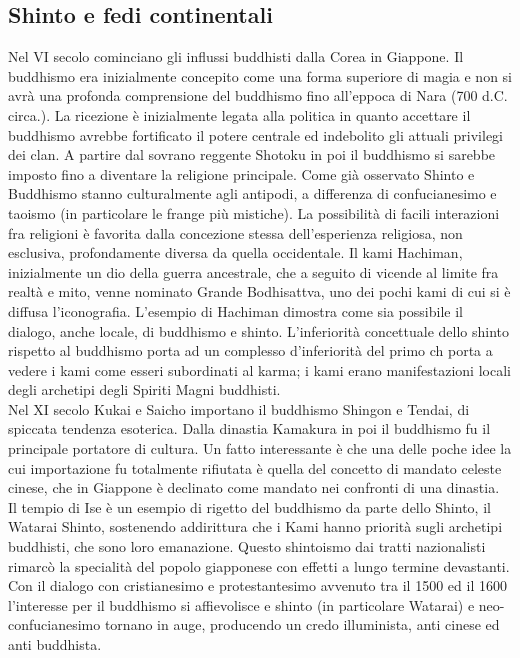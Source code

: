 \documentclass[10pt,a4paper]{report}
\begin{document}
\subsection{Shinto e fedi continentali}
Nel VI secolo cominciano gli influssi buddhisti dalla Corea in Giappone. Il buddhismo era inizialmente concepito come una forma superiore di magia e non si avrà una profonda comprensione del buddhismo fino all'eppoca di Nara (700 d.C. circa.). La ricezione è inizialmente legata alla politica in quanto accettare il buddhismo avrebbe fortificato il potere centrale ed indebolito gli attuali privilegi dei clan. A partire dal sovrano reggente Shotoku in poi il buddhismo si sarebbe imposto fino a diventare la religione principale. Come già osservato Shinto e Buddhismo stanno culturalmente agli antipodi, a differenza di confucianesimo e taoismo (in particolare le frange più mistiche). La possibilità di facili interazioni fra religioni è favorita dalla concezione stessa dell'esperienza religiosa, non esclusiva, profondamente diversa da quella occidentale. Il kami Hachiman, inizialmente un dio della guerra ancestrale, che a seguito di vicende al limite fra realtà e mito, venne nominato Grande Bodhisattva, uno dei pochi kami di cui si è diffusa l'iconografia. L'esempio di Hachiman dimostra come sia possibile il dialogo, anche locale, di buddhismo e shinto. L'inferiorità concettuale dello shinto rispetto al buddhismo porta ad un complesso d'inferiorità del primo ch porta a vedere i kami come esseri subordinati al karma; i kami erano manifestazioni locali degli archetipi degli Spiriti Magni buddhisti.\\
Nel XI secolo Kukai e Saicho importano il buddhismo Shingon e Tendai, di spiccata tendenza esoterica. Dalla dinastia Kamakura in poi il buddhismo fu il principale portatore di cultura. Un fatto interessante è che una delle poche idee la cui importazione fu totalmente rifiutata è quella del concetto di mandato celeste cinese, che in Giappone è declinato come mandato nei confronti di una dinastia. Il tempio di Ise è un esempio di rigetto del buddhismo da parte dello Shinto, il Watarai Shinto, sostenendo addirittura che i Kami hanno priorità sugli archetipi buddhisti, che sono loro emanazione. Questo shintoismo dai tratti nazionalisti rimarcò la specialità del popolo giapponese con effetti a lungo termine devastanti.\\
Con il dialogo con cristianesimo e protestantesimo avvenuto tra il 1500 ed il 1600 l'interesse per il buddhismo si affievolisce e shinto (in particolare Watarai) e neo-confucianesimo tornano in auge, producendo un credo illuminista, anti cinese ed anti buddhista.\\
\end{document}
